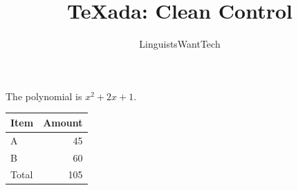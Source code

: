 \documentclass{article}
\title{TeXada: Clean Control}
\author{LinguistsWantTech}
\date{}
\begin{document}
\maketitle
The polynomial is $x^2+2x+1$.
\begin{tabular}{|l|r|}
\hline
Item & Amount \\
\hline
A & 45 \\
B & 60 \\
Total & 105 \\
\hline
\end{tabular}
\end{document}
